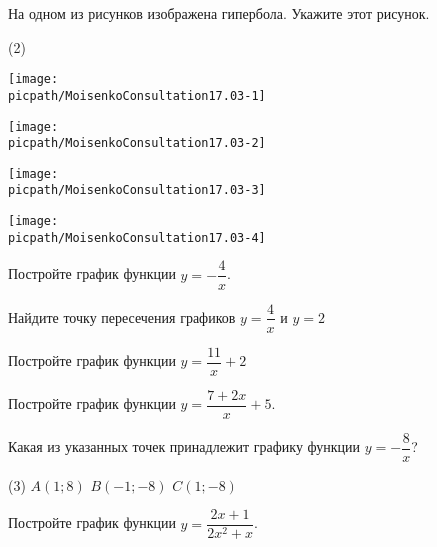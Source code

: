 \begin{consultation}
	\begin{listofex}
		\item  На одном из рисунков изображена гипербола. Укажите этот рисунок.
		\begin{tasks}(2)
			\task\begin{minipage}[t]{\picwidth}
				\texttt{[image: \\picpath/MoisenkoConsultation17.03-1]}
			\end{minipage}
			\task\begin{minipage}[t]{\picwidth}
				\texttt{[image: \\picpath/MoisenkoConsultation17.03-2]}
			\end{minipage}
			\task\begin{minipage}[t]{\picwidth}
				\texttt{[image: \\picpath/MoisenkoConsultation17.03-3]}
			\end{minipage}
			\task\begin{minipage}[t]{\picwidth}
				\texttt{[image: \\picpath/MoisenkoConsultation17.03-4]}
			\end{minipage}
		\end{tasks}
		\item Постройте график функции \( y=-\dfrac{4}{x} \).
		\item Найдите точку пересечения графиков \( y=\dfrac{4}{x} \) и \( y=2 \) 
		\item Постройте график функции \( y = \dfrac{11}{x}+2 \)
		\item Постройте график функции \( y = \dfrac{7+2x}{x}+5 \).
		\item  Какая из указанных точек принадлежит графику функции \( y = -\dfrac{8}{x} \)?\begin{tasks}(3)
			\task \( A (1;8) \) 
			\task \(  B (-1;-8) \)
			\task \( C (1 ; -8) \) 
		\end{tasks} 
		\item Постройте график функции  \(y=\dfrac{ 2x+1}{2x^{2}+x} \).
	\end{listofex}
\end{consultation}
